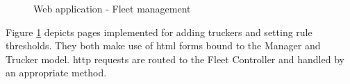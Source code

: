 \begin{figure}[H]
\centering
\caption{Web application - Fleet management}
\label{fig:webapp_userhandling}
\end{figure}
Figure \ref{fig:webapp_userhandling} depicts pages implemented for adding truckers and setting rule thresholds.
They both make use of \ac{html} forms bound to the Manager and Trucker model.
\Ac{http} requests are routed to the Fleet Controller and handled by an appropriate method.

